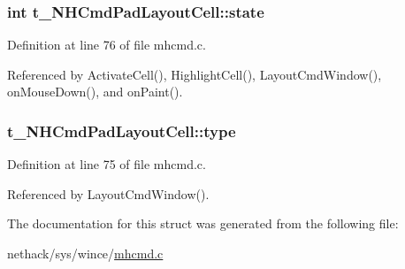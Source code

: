 \hypertarget{structt__NHCmdPadLayoutCell_a9ed2eeb5f8a90c1517ebc2865a4890bb}{
\subsubsection[{state}]{\setlength{\rightskip}{0pt plus 5cm}int t\+\_\+\+N\+H\+Cmd\+Pad\+Layout\+Cell\+::state}}\label{structt__NHCmdPadLayoutCell_a9ed2eeb5f8a90c1517ebc2865a4890bb}


Definition at line 76 of file mhcmd.\+c.



Referenced by Activate\+Cell(), Highlight\+Cell(), Layout\+Cmd\+Window(), on\+Mouse\+Down(), and on\+Paint().

\hypertarget{structt__NHCmdPadLayoutCell_a1c2a64952d42eae523db51f2fef5afcc}{
\subsubsection[{type}]{ t\+\_\+\+N\+H\+Cmd\+Pad\+Layout\+Cell\+::type}}\label{structt__NHCmdPadLayoutCell_a1c2a64952d42eae523db51f2fef5afcc}


Definition at line 75 of file mhcmd.\+c.



Referenced by Layout\+Cmd\+Window().



The documentation for this struct was generated from the following file\+:\begin{DoxyCompactItemize}
\item 
nethack/sys/wince/\hyperlink{mhcmd_8c}{mhcmd.\+c}\end{DoxyCompactItemize}
